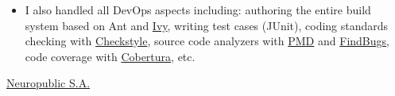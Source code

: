 \documentclass[10pt,a4paper]{article} %
\newcommand{\technologies}[0]{\textbf{\textit{Technologies:}}}
\begin{document}
{{{\begin{itemize}
      \technologies{} PostgreSQL 9.2, JDBC.
    \item I also handled all DevOps aspects including: authoring the entire build system based on
      Ant and \href{http://ant.apache.org/ivy/}{Ivy}, writing test cases (JUnit), coding standards checking with \href{http://checkstyle.sourceforge.net/}{Checkstyle}, source code analyzers with
      \href{https://pmd.github.io/}{PMD} and \href{http://findbugs.sourceforge.net/}{FindBugs},
      code coverage with \href{http://cobertura.github.io/cobertura/}{Cobertura}, etc.
  \end{itemize}

}}

}


\headedsection
{\href{http://www.neuropublic.com}{Neuropublic S.A.}}
\end{document}
